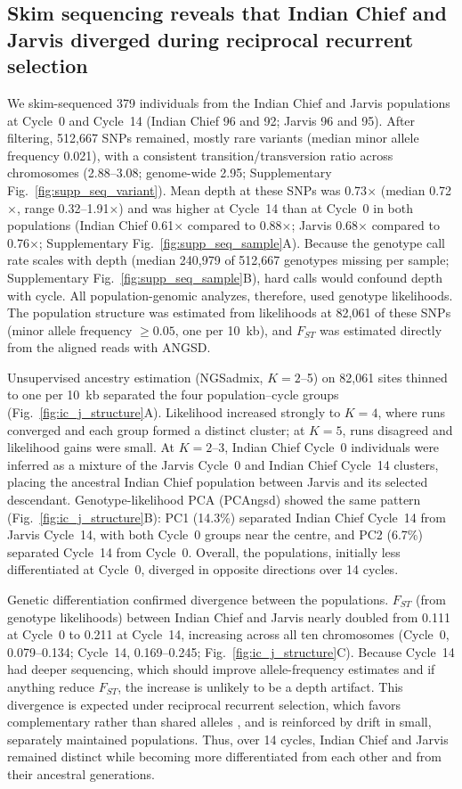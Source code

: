 \subsection{Skim sequencing reveals that Indian Chief and Jarvis diverged during reciprocal recurrent selection}

We skim-sequenced 379 individuals from the Indian Chief and Jarvis populations at Cycle~0 and Cycle~14 (Indian Chief 96 and 92; Jarvis 96 and 95). After filtering, 512,667 SNPs remained, mostly rare variants (median minor allele frequency 0.021), with a consistent transition/transversion ratio across chromosomes (2.88--3.08; genome-wide 2.95; Supplementary Fig.~\ref{fig:supp_seq_variant}). Mean depth at these SNPs was 0.73$\times$ (median 0.72$\times$, range 0.32--1.91$\times$) and was higher at Cycle~14 than at Cycle~0 in both populations (Indian Chief 0.61$\times$ compared to 0.88$\times$; Jarvis 0.68$\times$ compared to 0.76$\times$; Supplementary Fig.~\ref{fig:supp_seq_sample}A). Because the genotype call rate scales with depth (median 240,979 of 512,667 genotypes missing per sample; Supplementary Fig.~\ref{fig:supp_seq_sample}B), hard calls would confound depth with cycle. All population-genomic analyzes, therefore, used genotype likelihoods. The population structure was estimated from likelihoods at 82,061 of these SNPs (minor allele frequency $\ge 0.05$, one per 10~kb), and $F_{ST}$ was estimated directly from the aligned reads with ANGSD.

Unsupervised ancestry estimation (NGSadmix, $K = 2$--5) on 82,061 sites thinned to one per 10~kb separated the four population--cycle groups (Fig.~\ref{fig:ic_j_structure}A). Likelihood increased strongly to $K = 4$, where runs converged and each group formed a distinct cluster; at $K = 5$, runs disagreed and likelihood gains were small. At $K = 2$--3, Indian Chief Cycle~0 individuals were inferred as a mixture of the Jarvis Cycle~0 and Indian Chief Cycle~14 clusters, placing the ancestral Indian Chief population between Jarvis and its selected descendant. Genotype-likelihood PCA (PCAngsd) showed the same pattern (Fig.~\ref{fig:ic_j_structure}B): PC1 (14.3\%) separated Indian Chief Cycle~14 from Jarvis Cycle~14, with both Cycle~0 groups near the centre, and PC2 (6.7\%) separated Cycle~14 from Cycle~0. Overall, the populations, initially less differentiated at Cycle~0, diverged in opposite directions over 14 cycles.

Genetic differentiation confirmed divergence between the populations. $F_{ST}$ (from genotype likelihoods) between Indian Chief and Jarvis nearly doubled from 0.111 at Cycle~0 to 0.211 at Cycle~14, increasing across all ten chromosomes (Cycle~0, 0.079--0.134; Cycle~14, 0.169--0.245; Fig.~\ref{fig:ic_j_structure}C). Because Cycle~14 had deeper sequencing, which should improve allele-frequency estimates and if anything reduce $F_{ST}$, the increase is unlikely to be a depth artifact. This divergence is expected under reciprocal recurrent selection, which favors complementary rather than shared alleles \citep{Comstock1949RRS}, and is reinforced by drift in small, separately maintained populations. Thus, over 14 cycles, Indian Chief and Jarvis remained distinct while becoming more differentiated from each other and from their ancestral generations.

